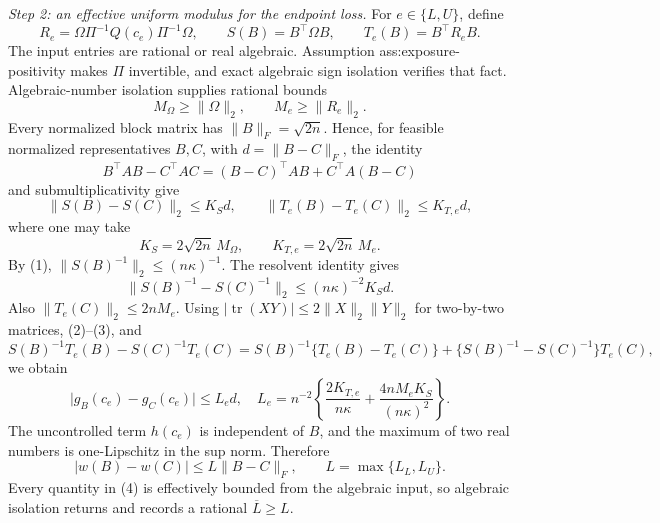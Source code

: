 \emph{Step 2: an effective uniform modulus for the endpoint loss.}
For \(e\in\{L,U\}\), define
\[
R_e=\Omega\Pi^{-1}Q(c_e)\Pi^{-1}\Omega,
\qquad S(B)=B^{\top}\Omega B,
\qquad T_e(B)=B^{\top}R_eB.
\]
The input entries are rational or real algebraic.  Assumption ass:exposure-positivity makes \(\Pi\) invertible, and exact algebraic sign isolation verifies that fact.  Algebraic-number isolation supplies rational bounds
\[
M_\Omega\ge\lVert\Omega\rVert_2,
\qquad M_e\ge\lVert R_e\rVert_2.
\]
Every normalized block matrix has \(\lVert B\rVert_F=\sqrt{2n}\).  Hence, for feasible normalized representatives \(B,C\), with \(d=\lVert B-C\rVert_F\), the identity
\[
B^{\top}AB-C^{\top}AC
=(B-C)^{\top}AB+C^{\top}A(B-C)
\]
and submultiplicativity give
\[
\lVert S(B)-S(C)\rVert_2\le K_Sd,
\qquad
\lVert T_e(B)-T_e(C)\rVert_2\le K_{T,e}d, \tag{2}
\]
where one may take
\[
K_S=2\sqrt{2n}\,M_\Omega,
\qquad K_{T,e}=2\sqrt{2n}\,M_e.
\]
By (1), \(\lVert S(B)^{-1}\rVert_2\le(n\kappa)^{-1}\).  The resolvent identity gives
\[
\lVert S(B)^{-1}-S(C)^{-1}\rVert_2
\le(n\kappa)^{-2}K_Sd. \tag{3}
\]
Also \(\lVert T_e(C)\rVert_2\le2nM_e\).  Using
\(\lvert\operatorname{tr}(XY)\rvert\le2\lVert X\rVert_2\lVert Y\rVert_2\)
for two-by-two matrices, (2)--(3), and
\[
S(B)^{-1}T_e(B)-S(C)^{-1}T_e(C)
=S(B)^{-1}\{T_e(B)-T_e(C)\}
+\{S(B)^{-1}-S(C)^{-1}\}T_e(C),
\]
we obtain
\[
\lvert g_B(c_e)-g_C(c_e)\rvert\le L_ed,
\quad
L_e=n^{-2}\left\{
\frac{2K_{T,e}}{n\kappa}
+\frac{4nM_eK_S}{(n\kappa)^2}
\right\}. \tag{4}
\]
The uncontrolled term \(h(c_e)\) is independent of \(B\), and the maximum of two real numbers is one-Lipschitz in the sup norm.  Therefore
\[
\lvert w(B)-w(C)\rvert
\le L\lVert B-C\rVert_F,
\qquad L=\max\{L_L,L_U\}. \tag{5}
\]
Every quantity in (4) is effectively bounded from the algebraic input, so algebraic isolation returns and records a rational \(\overline L\ge L\).

